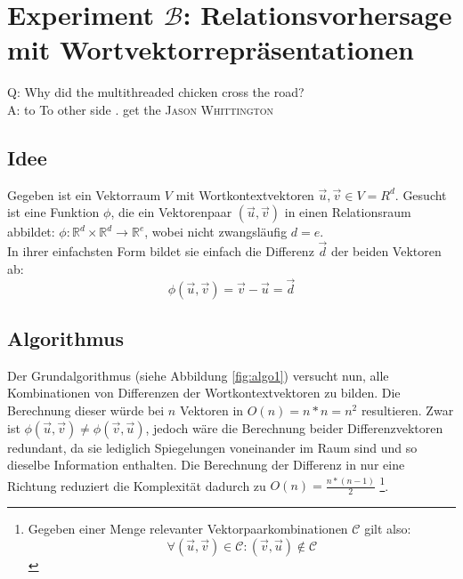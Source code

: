 
\chapter{Experiment $\mathcal{B}$: Relationsvorhersage mit Wortvektorrepräsentationen} %

\label{Chapter7} %


\begin{itquote}
Q: Why did the multithreaded chicken cross the road?\\
A: to To other side . get the
\flushright
\textsc{Jason Whittington}
\end{itquote}

\section{Idee}

Gegeben ist ein Vektorraum $V$ mit Wortkontextvektoren $\vec{u}, \vec{v} \in V = {R}^d$.
Gesucht ist eine Funktion $\phi$, die ein Vektorenpaar $(\vec{u}, \vec{v})$ in einen Relationsraum abbildet:
$\phi: \mathbb{R}^d \times \mathbb{R}^d \to \mathbb{R}^e$, wobei
nicht zwangsläufig $d = e$.\\
In ihrer einfachsten Form bildet sie einfach die Differenz $\vec{d}$ der beiden Vektoren ab:
\begin{equation}
  \phi(\vec{u}, \vec{v}) = \vec{v} - \vec{u} = \vec{d}
\end{equation}

\section{Algorithmus}

Der Grundalgorithmus (siehe Abbildung \ref{fig:algo1}) versucht nun, alle Kombinationen von Differenzen der
Wortkontextvektoren zu bilden. Die Berechnung dieser würde bei $n$ Vektoren in $O(n) = n * n = n^2$ resultieren.
Zwar ist $\phi(\vec{u}, \vec{v}) \neq \phi(\vec{v}, \vec{u})$, jedoch wäre die Berechnung beider Differenzvektoren redundant,
da sie lediglich Spiegelungen voneinander im Raum sind und so dieselbe Information enthalten. Die Berechnung
der Differenz in nur eine Richtung reduziert die Komplexität dadurch zu $O(n) = \frac{n * (n-1)}{2}$
\footnote{
Gegeben einer Menge relevanter Vektorpaarkombinationen $\mathcal{C}$ gilt also:
\[
  \forall (\vec{u}, \vec{v}) \in \mathcal{C}: (\vec{v}, \vec{u}) \notin \mathcal{C}
\]
}.

